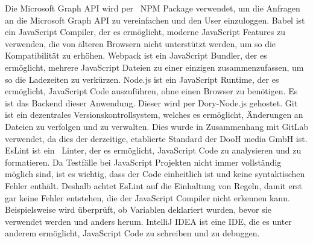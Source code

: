 Die Microsoft Graph API wird per ~\gls{NPM} Package verwendet, um die Anfragen an die Microsoft Graph API zu vereinfachen und den User einzuloggen.
\newline
\newline
Babel ist ein JavaScript Compiler, der es ermöglicht, moderne JavaScript Features zu verwenden, die von älteren Browsern nicht unterstützt werden, um so die Kompatibilität zu erhöhen.
\newline
\newline
Webpack ist ein JavaScript Bundler, der es ermöglicht, mehrere JavaScript Dateien zu einer einzigen zusammenzufassen, um so die Ladezeiten zu verkürzen.
\newline
\newline
Node.js ist ein JavaScript Runtime, der es ermöglicht, JavaScript Code auszuführen, ohne einen Browser zu benötigen.
Es ist das Backend dieser Anwendung.
Dieser wird per Dory-Node.js gehostet.
\newline
\newline
Git ist ein dezentrales Versionskontrollsystem, welches es ermöglicht, Änderungen an Dateien zu verfolgen und zu verwalten.
Dies wurde in Zusammenhang mit GitLab verwendet, da dies der derzeitige, etablierte Standard der DooH media GmbH ist.
\newline
\newline
{}
EsLint ist ein ~\gls{Linter}, der es ermöglicht, JavaScript Code zu analysieren und zu formatieren.
Da Testfälle bei JavaScript Projekten nicht immer vollständig möglich sind, ist es wichtig, dass der Code einheitlich ist und keine syntaktischen Fehler enthält.
Deshalb achtet EsLint auf die Einhaltung von Regeln, damit erst gar keine Fehler entstehen, die der JavaScript Compiler nicht erkennen kann.
Beispielsweise wird überprüft, ob Variablen deklariert wurden, bevor sie verwendet werden und anders herum.
\newline
\newline
IntelliJ IDEA ist eine IDE, die es unter anderem ermöglicht, JavaScript Code zu schreiben und zu debuggen.
\newline
\newline
